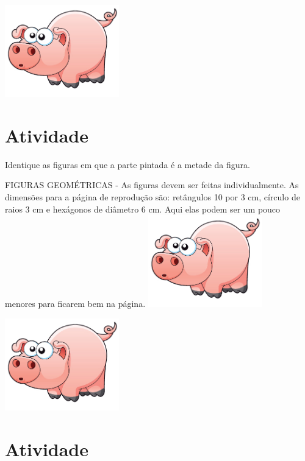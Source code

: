 \documentclass[a4,12pt]{book}
\begin{document}
\includegraphics[width=\textwidth,height=4cm, keepaspectratio]{pig}
\section{Atividade}








Identique as figuras em que a parte pintada é a metade da figura.
\begin{imagem*}[breakable]{}{}    FIGURAS GEOMÉTRICAS - As figuras devem ser feitas individualmente. As dimensões para a página de reprodução são: retângulos 10 por 3 cm, círculo de raios 3 cm e hexágonos de diâmetro 6 cm. Aqui elas podem ser um pouco menores para ficarem bem na página.
    \includegraphics[width=\textwidth,height=4cm, keepaspectratio]{pig}
\end{imagem*}










\includegraphics[width=\textwidth,height=4cm, keepaspectratio]{pig}
\section{Atividade}
\end{document}
